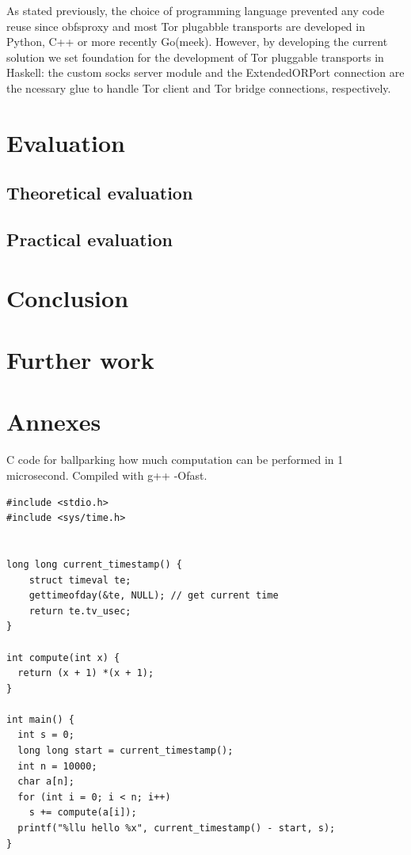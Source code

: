 \documentclass[11pt]{article} %
\begin{document}
As stated previously, the choice of programming language prevented any code reuse since obfsproxy and most Tor plugabble transports are developed in Python, C++ or more recently Go(meek). However, by developing the current solution we set foundation for the development of Tor pluggable transports in Haskell: the custom socks server module and the ExtendedORPort connection are the ncessary glue to handle Tor client and Tor bridge connections, respectively.

 

\section{Evaluation}


\subsection{Theoretical evaluation}

\subsection{Practical evaluation}

\section{Conclusion}

\section{Further work}


\section{Annexes}


C code for ballparking how much computation can be performed in 1 microsecond.
Compiled with g++ -Ofast.
\begin{lstlisting}
#include <stdio.h>
#include <sys/time.h>


long long current_timestamp() {
    struct timeval te; 
    gettimeofday(&te, NULL); // get current time
    return te.tv_usec;
}

int compute(int x) {
  return (x + 1) *(x + 1);
}

int main() {
  int s = 0;
  long long start = current_timestamp(); 
  int n = 10000;
  char a[n];
  for (int i = 0; i < n; i++)
    s += compute(a[i]);
  printf("%llu hello %x", current_timestamp() - start, s);
}
\end{lstlisting}


\newpage

\end{document}
